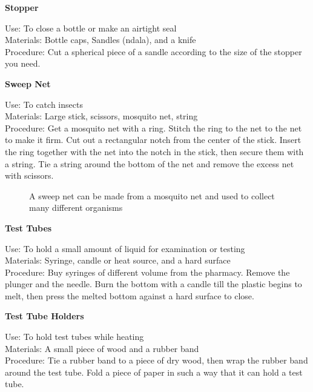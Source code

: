 \begin{flushleft}
\textbf{Stopper}
\end{flushleft}
\vspace{-10pt}
Use: To close a bottle or make an airtight seal\\
Materials: Bottle caps, Sandles (ndala), and a knife\\
Procedure: Cut a spherical piece of a sandle according to the size of the stopper you need.\\

\begin{flushleft}
\textbf{Sweep Net}
\end{flushleft}
\vspace{-10pt}
Use: To catch insects\\
Materials: Large stick, scissors, mosquito net, string\\
Procedure: Get a mosquito net with a ring. Stitch the ring to the net to the net to make it firm. Cut out a rectangular notch from the center of the stick. Insert the ring together with the net into the notch in the stick, then secure them with a string. Tie a string around the bottom of the net and remove the excess net with scissors.\\

\begin{figure}[h]
\begin{center}
\def\svgwidth{9cm}

\caption{A sweep net can be made from a mosquito net and used to collect many different organisms}
\label{fig:butterfly-net}
\end{center}
\end{figure}


\begin{flushleft}
\textbf{Test Tubes}
\end{flushleft}
\vspace{-10pt}
Use: To hold a small amount of liquid for examination or testing\\
Materials: Syringe, candle or heat source, and a hard surface\\
Procedure: Buy syringes of different volume from the pharmacy. Remove the plunger and the needle. Burn the bottom with a candle till the plastic begins to melt, then press the melted bottom against a hard surface to close.\\

\begin{flushleft}
\textbf{Test Tube Holders}
\end{flushleft}
\vspace{-10pt}
Use: To hold test tubes while heating\\
Materials: A small piece of wood and a rubber band\\
Procedure: Tie a rubber band to a piece of dry wood, then wrap the rubber band around the test tube. Fold a piece of paper in such a way that it can hold a test tube.\\

